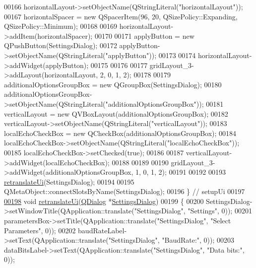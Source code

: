 \begin{DoxyCode}
00166         horizontalLayout->setObjectName(QStringLiteral(\textcolor{stringliteral}{"horizontalLayout"}));
00167         horizontalSpacer = \textcolor{keyword}{new} QSpacerItem(96, 20, QSizePolicy::Expanding, QSizePolicy::Minimum);
00168 
00169         horizontalLayout->addItem(horizontalSpacer);
00170 
00171         applyButton = \textcolor{keyword}{new} QPushButton(SettingsDialog);
00172         applyButton->setObjectName(QStringLiteral(\textcolor{stringliteral}{"applyButton"}));
00173 
00174         horizontalLayout->addWidget(applyButton);
00175 
00176 
00177         gridLayout\_3->addLayout(horizontalLayout, 2, 0, 1, 2);
00178 
00179         additionalOptionsGroupBox = \textcolor{keyword}{new} QGroupBox(SettingsDialog);
00180         additionalOptionsGroupBox->setObjectName(QStringLiteral(\textcolor{stringliteral}{"additionalOptionsGroupBox"}));
00181         verticalLayout = \textcolor{keyword}{new} QVBoxLayout(additionalOptionsGroupBox);
00182         verticalLayout->setObjectName(QStringLiteral(\textcolor{stringliteral}{"verticalLayout"}));
00183         localEchoCheckBox = \textcolor{keyword}{new} QCheckBox(additionalOptionsGroupBox);
00184         localEchoCheckBox->setObjectName(QStringLiteral(\textcolor{stringliteral}{"localEchoCheckBox"}));
00185         localEchoCheckBox->setChecked(\textcolor{keyword}{true});
00186 
00187         verticalLayout->addWidget(localEchoCheckBox);
00188 
00189 
00190         gridLayout\_3->addWidget(additionalOptionsGroupBox, 1, 0, 1, 2);
00191 
00192 
00193         \hyperlink{a00029_a7a0adf32eef516ceffcc0633a90c3b34}{retranslateUi}(SettingsDialog);
00194 
00195         QMetaObject::connectSlotsByName(SettingsDialog);
00196     \} \textcolor{comment}{// setupUi}
00197 
\hypertarget{a00054_source_l00198}{}\hyperlink{a00029_a7a0adf32eef516ceffcc0633a90c3b34}{00198}     \textcolor{keywordtype}{void} \hyperlink{a00029_a7a0adf32eef516ceffcc0633a90c3b34}{retranslateUi}(\hyperlink{a00009}{QDialog} *\hyperlink{a00022}{SettingsDialog})
00199     \{
00200         SettingsDialog->setWindowTitle(QApplication::translate(\textcolor{stringliteral}{"SettingsDialog"}, \textcolor{stringliteral}{"Settings"}, 0));
00201         parametersBox->setTitle(QApplication::translate(\textcolor{stringliteral}{"SettingsDialog"}, \textcolor{stringliteral}{"Select Parameters"}, 0));
00202         baudRateLabel->setText(QApplication::translate(\textcolor{stringliteral}{"SettingsDialog"}, \textcolor{stringliteral}{"BaudRate:"}, 0));
00203         dataBitsLabel->setText(QApplication::translate(\textcolor{stringliteral}{"SettingsDialog"}, \textcolor{stringliteral}{"Data bits:"}, 0));

\end{DoxyCode}
